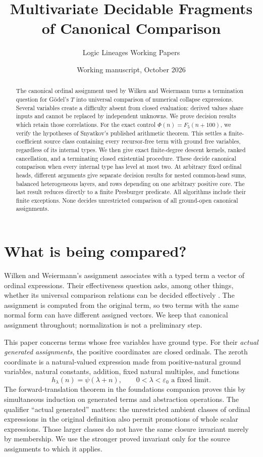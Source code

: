 \documentclass[11pt]{article}
\title{Multivariate Decidable Fragments\\of Canonical Comparison}
\author{Logic Lineages Working Papers}
\date{Working manuscript, October 2026}
\begin{document}
\maketitle
\begin{abstract}
The canonical ordinal assignment used by Wilken and Weiermann turns a
termination question for G\"odel's $T$ into universal comparison of numerical
collapse expressions. Several variables create a difficulty absent from
closed evaluation: derived values share inputs and cannot be replaced by
independent unknowns. We prove decision results which retain those
correlations. For the exact control $\Phi(n)=F_5(n+100)$, we verify the
hypotheses of Snyatkov's published arithmetic theorem. This settles a
finite-coefficient source class containing every recursor-free term with
ground free variables, regardless of its internal types. We then give exact
finite-degree descent kernels, ranked cancellation, and a terminating closed
existential procedure. These decide canonical comparison when every internal
type has level at most two. At arbitrary fixed ordinal heads, different
arguments give separate decision results for nested common-head sums,
balanced heterogeneous layers, and rows depending on one arbitrary positive
core. The last result reduces directly to a finite Presburger predicate.
All algorithms include their finite exceptions. None decides unrestricted
comparison of all ground-open canonical assignments.
\end{abstract}
\tableofcontents

\section{What is being compared?}
Wilken and Weiermann's assignment associates with a typed term a vector of
ordinal expressions. Their effectiveness question asks, among other things,
whether its universal comparison relations can be decided effectively
\cite{ww}. The assignment is computed from the original term, so two terms
with the same normal form can have different assigned vectors. We keep that
canonical assignment throughout; normalization is not a preliminary step.

This paper concerns terms whose free variables have ground type. For their
\emph{actual generated assignments}, the positive coordinates are closed
ordinals. The zeroth coordinate is a natural-valued expression made from
positive-natural ground variables, natural constants, addition, fixed natural
multiples, and functions
\[
 h_\lambda(n)=\psi(\lambda+n),
 \qquad 0<\lambda<\varepsilon_0\text{ a fixed limit}.
\]
The forward-translation theorem in the foundations companion
\cite{wwfoundations} proves this by simultaneous induction on generated
terms and abstraction operations. The qualifier ``actual generated''
matters: the unrestricted ambient classes of ordinal expressions in the
original definition also permit promotions of whole scalar expressions.
Those larger classes do not have the same closure invariant merely by
membership. We use the stronger proved invariant only for the source
assignments to which it applies.
\end{document}
